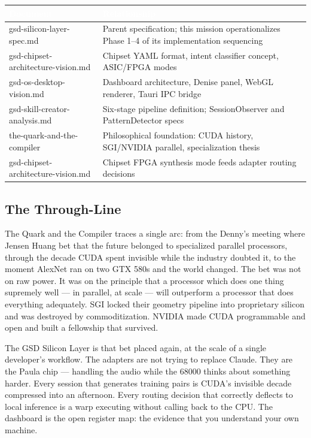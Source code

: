 \documentclass[11pt,letterpaper]{article}
\newcommand{\tableheader}[1]{\textbf{\sffamily\textcolor{white}{#1}}}
\begin{document}
\begin{center}
\begin{tabularx}{\textwidth}{L{5.5cm}X}
\toprule
{}
\tableheader{Document} & \tableheader{Relationship} \\
\midrule
gsd-silicon-layer-spec.md & Parent specification; this mission operationalizes Phase 1--4 of its implementation sequencing \\
gsd-chipset-architecture-vision.md & Chipset YAML format, intent classifier concept, ASIC/FPGA modes \\
gsd-os-desktop-vision.md & Dashboard architecture, Denise panel, WebGL renderer, Tauri IPC bridge \\
gsd-skill-creator-analysis.md & Six-stage pipeline definition; SessionObserver and PatternDetector specs \\
the-quark-and-the-compiler & Philosophical foundation: CUDA history, SGI/NVIDIA parallel, specialization thesis \\
gsd-chipset-architecture-vision.md & Chipset FPGA synthesis mode feeds adapter routing decisions \\
\bottomrule
\end{tabularx}
\end{center}

\subsection{The Through-Line}

The Quark and the Compiler traces a single arc: from the Denny's meeting where Jensen Huang bet that the future belonged to specialized parallel processors, through the decade CUDA spent invisible while the industry doubted it, to the moment AlexNet ran on two GTX 580s and the world changed. The bet was not on raw power. It was on the principle that a processor which does one thing supremely well --- in parallel, at scale --- will outperform a processor that does everything adequately. SGI locked their geometry pipeline into proprietary silicon and was destroyed by commoditization. NVIDIA made CUDA programmable and open and built a fellowship that survived.

The GSD Silicon Layer is that bet placed again, at the scale of a single developer's workflow. The adapters are not trying to replace Claude. They are the Paula chip --- handling the audio while the 68000 thinks about something harder. Every session that generates training pairs is CUDA's invisible decade compressed into an afternoon. Every routing decision that correctly deflects to local inference is a warp executing without calling back to the CPU. The dashboard is the open register map: the evidence that you understand your own machine.
\end{document}
